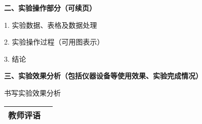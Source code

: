 \documentclass[12px]{article}
\begin{document}
\begin{center}
\begin{tabular}{|m{1.98cm}<{\centering}|m{3.25cm}<{\centering}|m{1.75cm}<{\centering}|m{3.27cm}<{\centering}|m{2.33cm}<{\centering}|m{2.35cm}<{\centering}m{0cm}|}
        \end{tabular}
    \end{center}


    \newpage
    \fancypage{\fbox}{}
    \textbf{二、实验操作部分（可续页）}

        1. 实验数据、表格及数据处理

        2. 实验操作过程（可用图表示）

        3. 结论


    \newpage
    \fancypage{\fbox}{}
    \textbf{三、实验效果分析（包括仪器设备等使用效果、实验完成情况）}

    书写实验效果分析
    \newpage
    \fancypage{}{}
    \begin{center}
        \begin{tabular}{|m{1em}|m{15.5cm}|}
            \hline
            教师评语 & \rule{0em}{21cm} \\
            \hline
        \end{tabular}
    \end{center}
\end{document}
